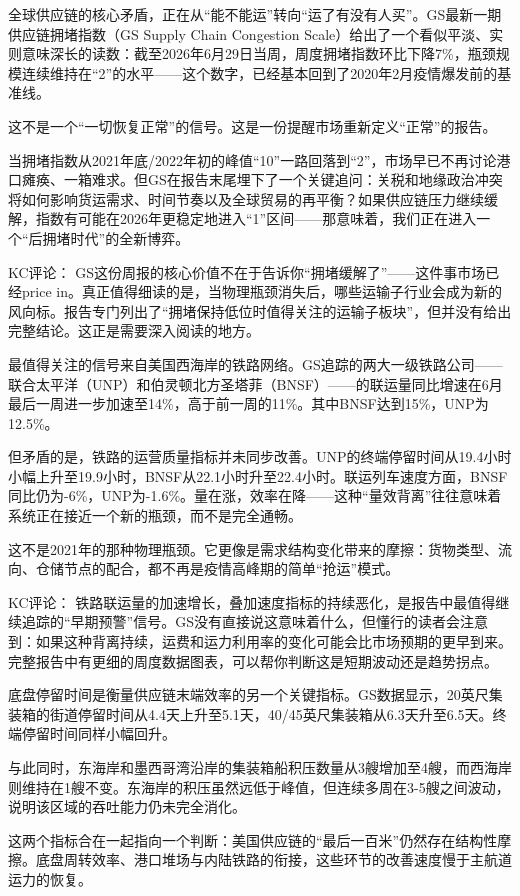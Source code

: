 \documentclass[11pt]{ctexart}
\begin{document}
全球供应链的核心矛盾，正在从“能不能运”转向“运了有没有人买”。GS最新一期供应链拥堵指数（GS Supply Chain Congestion Scale）给出了一个看似平淡、实则意味深长的读数：截至2026年6月29日当周，周度拥堵指数环比下降7\%，瓶颈规模连续维持在“2”的水平——这个数字，已经基本回到了2020年2月疫情爆发前的基准线。

这不是一个“一切恢复正常”的信号。这是一份提醒市场重新定义“正常”的报告。

当拥堵指数从2021年底/2022年初的峰值“10”一路回落到“2”，市场早已不再讨论港口瘫痪、一箱难求。但GS在报告末尾埋下了一个关键追问：关税和地缘政治冲突将如何影响货运需求、时间节奏以及全球贸易的再平衡？如果供应链压力继续缓解，指数有可能在2026年更稳定地进入“1”区间——那意味着，我们正在进入一个“后拥堵时代”的全新博弈。

KC评论： GS这份周报的核心价值不在于告诉你“拥堵缓解了”——这件事市场已经price in。真正值得细读的是，当物理瓶颈消失后，哪些运输子行业会成为新的风向标。报告专门列出了“拥堵保持低位时值得关注的运输子板块”，但并没有给出完整结论。这正是需要深入阅读的地方。

最值得关注的信号来自美国西海岸的铁路网络。GS追踪的两大一级铁路公司——联合太平洋（UNP）和伯灵顿北方圣塔菲（BNSF）——的联运量同比增速在6月最后一周进一步加速至14\%，高于前一周的11\%。其中BNSF达到15\%，UNP为12.5\%。

但矛盾的是，铁路的运营质量指标并未同步改善。UNP的终端停留时间从19.4小时小幅上升至19.9小时，BNSF从22.1小时升至22.4小时。联运列车速度方面，BNSF同比仍为-6\%，UNP为-1.6\%。量在涨，效率在降——这种“量效背离”往往意味着系统正在接近一个新的瓶颈，而不是完全通畅。

这不是2021年的那种物理瓶颈。它更像是需求结构变化带来的摩擦：货物类型、流向、仓储节点的配合，都不再是疫情高峰期的简单“抢运”模式。

KC评论： 铁路联运量的加速增长，叠加速度指标的持续恶化，是报告中最值得继续追踪的“早期预警”信号。GS没有直接说这意味着什么，但懂行的读者会注意到：如果这种背离持续，运费和运力利用率的变化可能会比市场预期的更早到来。完整报告中有更细的周度数据图表，可以帮你判断这是短期波动还是趋势拐点。

底盘停留时间是衡量供应链末端效率的另一个关键指标。GS数据显示，20英尺集装箱的街道停留时间从4.4天上升至5.1天，40/45英尺集装箱从6.3天升至6.5天。终端停留时间同样小幅回升。

与此同时，东海岸和墨西哥湾沿岸的集装箱船积压数量从3艘增加至4艘，而西海岸则维持在1艘不变。东海岸的积压虽然远低于峰值，但连续多周在3-5艘之间波动，说明该区域的吞吐能力仍未完全消化。

这两个指标合在一起指向一个判断：美国供应链的“最后一百米”仍然存在结构性摩擦。底盘周转效率、港口堆场与内陆铁路的衔接，这些环节的改善速度慢于主航道运力的恢复。
\end{document}
